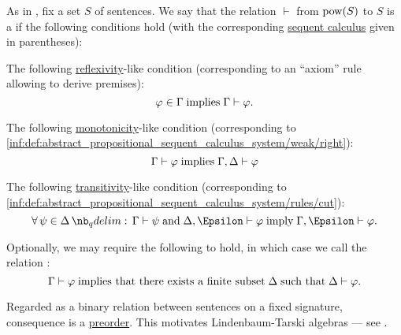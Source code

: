 \begin{definition}\label{def:consequence_relation}
  As in , fix a set \( S \) of sentences. We say that the relation \( \vdash \) from \( \operatorname{pow}(S) \) to \( S \) is a  if the following conditions hold (with the corresponding \hyperref[rem:sequent_calculus]{sequent calculus} given in parentheses):
  \begin{thmenum}
     The following \hyperref[def:binary_relation/reflexive]{reflexivity}-like condition (corresponding to an \enquote{axiom} rule allowing to derive premises):
    \begin{equation}\label{eq:def:consequence_relation/reflexivity}
      \varphi \in \Gamma \T{implies} \Gamma \vdash \varphi.
    \end{equation}

     The following \hyperref[def:order_function/preserving]{monotonicity}-like condition (corresponding to \ref{inf:def:abstract_propositional_sequent_calculus_system/weak/right}):
    \begin{equation}\label{eq:def:consequence_relation/monotonicity}
      \Gamma \vdash \varphi \T{implies} \Gamma, \Delta \vdash \varphi
    \end{equation}

     The following \hyperref[def:binary_relation/transitive]{transitivity}-like condition (corresponding to \ref{inf:def:abstract_propositional_sequent_calculus_system/rules/cut}):
    \begin{equation}\label{eq:def:consequence_relation/transitivity}
      \quantifier \forall {\psi \in \Delta} \Gamma \vdash \psi \T{and} \Delta, \Epsilon \vdash \varphi \T{imply} \Gamma, \Epsilon \vdash \varphi.
    \end{equation}

     Optionally, we may require the following to hold, in which case we call the relation :
    \begin{equation}\label{eq:def:consequence_relation/compactness}
      \Gamma \vdash \varphi \T{implies that there exists a finite subset} \Delta \T{such that} \Delta \vdash \varphi.
    \end{equation}
  \end{thmenum}
\end{definition}
\begin{comments}
  \item Regarded as a binary relation between sentences on a fixed signature, consequence is a \hyperref[def:preordered_set]{preorder}. This motivates Lindenbaum-Tarski algebras --- see .
\end{comments}

